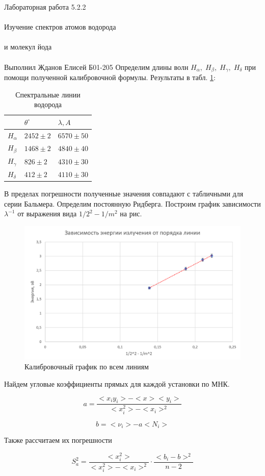 \documentclass{astroedu-lab}
\begin{document}
\begin{problem}{\huge Лабораторная работа 5.2.2\\\\Изучение спектров атомов водорода\\\\и молекул йода\\\\Выполнил Жданов Елисей Б01-205}
	Определим длины волн $H_\alpha,\;H_\beta,\;H_\gamma,\;H_\delta $ при помощи полученной калибровочной формулы. Результаты в табл. \ref{tab:H}:
	\begin{table}[h]
		\centering
		\begin{tabular}{|l|l|l|}
			\hline
			& $\theta^\circ$ & $\lambda, A$ \\ \hline
			$ H_\alpha$ & $2452\pm 2$      & $6570\pm 50$        \\ \hline
			$H_\beta$   & $1468\pm 2$      & $4840\pm 40$         \\ \hline
			$H_\gamma$  & $826\pm 2$      & $4310\pm 30$         \\ \hline
			$H_\delta$  & $412\pm 2$       & $4110\pm 30$         \\ \hline
		\end{tabular}
		\caption{Спектральные линии водорода}
		\label{tab:H}
	\end{table}
	В пределах погрешности полученные значения совпадают с табличными для серии Бальмера. Определим постоянную Ридберга. Построим график зависимости $ \lambda^{-1} $ от выражения вида $ 1/2^2 - 1/m^2 $ на рис.
	\begin{figure}[!h]
		\centering
		\includegraphics[width=0.9\linewidth]{R}
		\caption{Калибровочный график по всем линиям}
		\label{fig:graph2}
	\end{figure}

Найдем угловые коэффициенты прямых для каждой установки по МНК.

\[
	a = \frac{<x_i y_i> - < x > < y_i >}{< x_i^2> - < x_i >^2}
\]

\[
	b = < \nu_i > - a < N_i >
\]

Также рассчитаем их погрешности

\begin{equation}
	S_a^2 = \frac{< x_i^2>}{< x_i^2 > - < x_i >^2} \cdot \frac{<  b_i - b > ^2}{n - 2}
\end{equation}


\end{problem}
\end{document}
